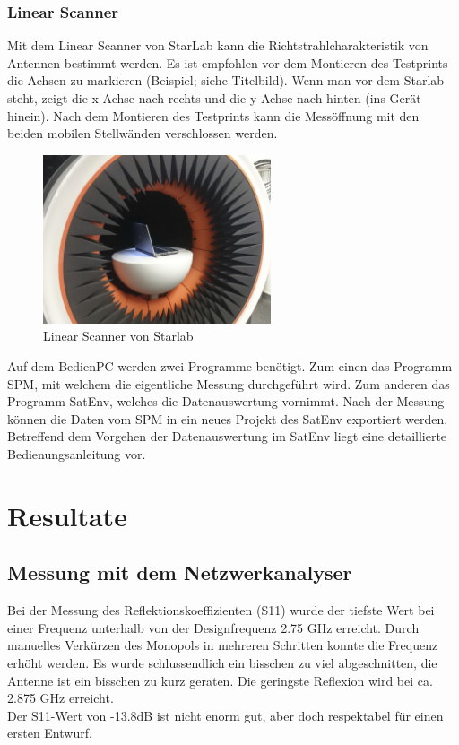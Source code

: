 \newpage
\subsubsection{Linear Scanner}
Mit dem Linear Scanner von StarLab kann die Richtstrahlcharakteristik von Antennen bestimmt werden. Es ist empfohlen vor dem Montieren des Testprints die Achsen zu markieren (Beispiel; siehe Titelbild). Wenn man vor dem Starlab steht, zeigt die x-Achse nach rechts und die y-Achse nach hinten (ins Gerät hinein). Nach dem Montieren des Testprints kann die Messöffnung mit den beiden mobilen Stellwänden verschlossen werden.\ \\

\begin{figure}[htbp]
	\centering
	\includegraphics[width=0.6\textwidth]{pic/Messungen/Starlab.JPG}
	\caption{Linear Scanner von Starlab}
	\label{fig:Starlab}
\end{figure}


Auf dem BedienPC werden zwei Programme benötigt. Zum einen das Programm SPM, mit welchem die eigentliche Messung durchgeführt wird. Zum anderen das Programm SatEnv, welches die Datenauswertung vornimmt. Nach der Messung können die Daten vom SPM in ein neues Projekt des SatEnv exportiert werden. Betreffend dem Vorgehen der Datenauswertung im SatEnv liegt eine detaillierte Bedienungsanleitung vor.

\newpage
\section{Resultate}


\subsection{Messung mit dem Netzwerkanalyser}
Bei der Messung des Reflektionskoeffizienten (S11) wurde der tiefste Wert bei einer Frequenz unterhalb von der Designfrequenz 2.75 GHz erreicht. Durch manuelles Verkürzen des Monopols in mehreren Schritten konnte die Frequenz erhöht werden. Es wurde schlussendlich ein bisschen zu viel abgeschnitten, die Antenne ist ein bisschen zu kurz geraten. Die geringste Reflexion wird bei ca. 2.875 GHz erreicht.\\
Der S11-Wert von -13.8dB ist nicht enorm gut, aber doch respektabel für einen ersten Entwurf.

